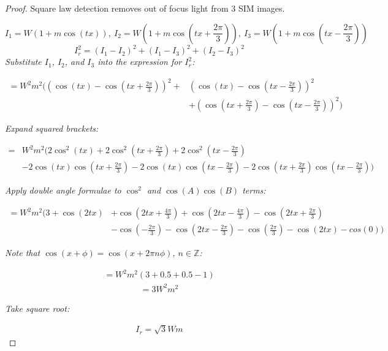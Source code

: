 \begin{proof}
\caption{Square law detection removes out of focus light from 3 SIM images.}\label{pro:square}

\begin{equation*}
I_1 = W(1+m\cos(tx)),~I_2 = W(1+m\cos(tx+\frac{2\pi}{3})),~I_3 = W(1+m\cos(tx-\frac{2\pi}{3}))
\end{equation*}
\begin{equation*}
I_r^2 = (I_1 - I_2)^2 + (I_1 - I_3)^2 + (I_2 - I_3)^2
\end{equation*}
\textit{Substitute $I_1$, $I_2$, and $I_3$ into the expression for $I_r^2$:}

\begin{align*}
=W^2m^2\Bigg(\left(\cos(tx)-\cos(tx+\frac{2\pi}{3})\right)^2+&\left(\cos(tx)-\cos(tx-\frac{2\pi}{3})\right)^2\\&+\left(\cos(tx+\frac{2\pi}{3})-\cos(tx-\frac{2\pi}{3})\right)^2\Bigg)
\end{align*}

\textit{Expand squared brackets:}

\begin{align*}
=& W^2m^2\Big(2\cos^2(tx) + 2\cos^2(tx+\frac{2\pi}{3}) + 2\cos^2(tx-\frac{2\pi}{3}) 
 \\& - 2\cos(tx)\cos(tx+\frac{2\pi}{3}) - 2\cos(tx)\cos(tx-\frac{2\pi}{3}) - 2\cos(tx+\frac{2\pi}{3})\cos(tx-\frac{2\pi}{3})\Big)
\end{align*}

\textit{Apply double angle formulae to $\cos^2$ and $\cos(A)\cos(B)$ terms:}

\begin{align*}
= W^2m^2\Big(3 + \cos(2tx) &+ \cos(2tx+\frac{4\pi}{3}) + \cos(2tx-\frac{4\pi}{3})
- \cos(2tx+\frac{2\pi}{3}) \\&- \cos(-\frac{2\pi}{3}) - \cos(2tx-\frac{2\pi}{3}) - \cos(\frac{2\pi}{3}) -\cos(2tx) - cos(0)\Big)
\end{align*}

\textit{Note that $\cos(x+\phi) = \cos(x+2\pi n\phi)$, $n\in \mathbb{Z}$:}

\begin{align*}
= W^2m^2(3 + 0.5 + 0.5 - 1)
\end{align*}
\begin{align*}
= 3W^2m^2
\end{align*}

\textit{Take square root:}

\begin{align*}
I_r = \sqrt3Wm
\end{align*}

\end{proof}


